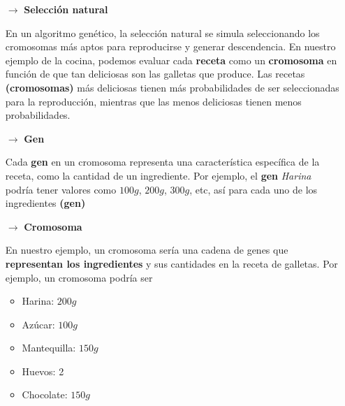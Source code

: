 \begin{itemize}
    \item[$\rightarrow$] \textbf{Selección natural}
    
    En un algoritmo genético, la selección natural se simula seleccionando los cromosomas 
    más aptos para reproducirse y generar descendencia. En nuestro ejemplo de la cocina, podemos
    evaluar cada \textbf{receta} como un \textbf{cromosoma} en función de que tan deliciosas 
    son las galletas que produce. Las recetas \textbf{(cromosomas)} más deliciosas tienen 
    más probabilidades de ser seleccionadas para la reproducción, mientras que las menos 
    deliciosas tienen menos probabilidades.

    \item[$\rightarrow$] \textbf{Gen}
    
    Cada \textbf{gen} en un cromosoma representa una característica específica de la receta, 
    como la cantidad de un ingrediente. Por ejemplo, el \textbf{gen} \textit{Harina} podría tener 
    valores como $100g$, $200g$, $300g$, etc, así para cada uno de los ingredientes \textbf{(gen)}

    \item[$\rightarrow$] \textbf{Cromosoma}

    En nuestro ejemplo, un cromosoma sería una cadena de genes que \textbf{representan los 
    ingredientes} y sus cantidades en la receta de galletas. Por ejemplo, un cromosoma podría ser 

    \begin{minipage}{0.4\textwidth}
        \begin{itemize}
            \item Harina: $200g$
            \item Azúcar: $100g$
            \item Mantequilla: $150g$        
        \end{itemize}    
    \end{minipage}
    \begin{minipage}{0.4\textwidth}
        \begin{flushright}
            \begin{itemize}                
                \item Huevos: 2
                \item Chocolate: $150g$
            \end{itemize}
        \end{flushright}
    \end{minipage}
    

\end{itemize}
